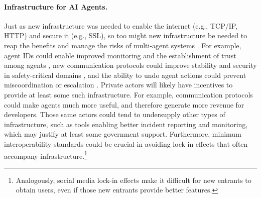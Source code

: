 \paragraph{Infrastructure for AI Agents.}
Just as new infrastructure was needed to enable the internet (e.g., TCP/IP, HTTP) and secure it (e.g., SSL), so too might new infrastructure be needed to reap the benefits and manage the risks of multi-agent systems \citep{Chan2025}. 
For example, agent IDs could enable improved monitoring and the establishment of trust among agents \citep{Chan2024}, new communication protocols could improve stability and security in safety-critical domains \citep{Marro2024,Hammond2025}, and the ability to undo agent actions could prevent miscoordination or escalation \citep{Patil2024}.
Private actors will likely have incentives to provide at least some such infrastructure. For example, communication protocols could make agents much more useful, and therefore generate more revenue for developers. 
Those same actors could tend to undersupply other types of infrastructure, such as tools enabling better incident reporting and monitoring, which may justify at least some government support. 
Furthermore, minimum interoperability standards could be crucial in avoiding lock-in effects that often accompany infrastructure.\footnote{Analogously, social media lock-in effects make it difficult for new entrants to obtain users, even if those new entrants provide better features.} %

